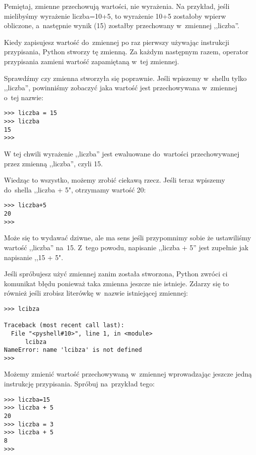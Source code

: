 \documentclass{book}
\begin{document}
Pemiętaj, zmienne przechowują wartości, nie wyrażenia. Na przykład, jeśli mielibyśmy wyrażenie liczba=10+5, to wyrażenie 10+5 zostałoby wpierw obliczone, a~następnie wynik (15) zostałby przechowany w~zmiennej ,,liczba''.

Kiedy zapisujesz wartość do~zmiennej po raz pierwszy używając instrukcji przypisania, Python stworzy tę zmienną. Za każdym następnym razem, operator przypisania zamieni wartość zapamiętaną w~tej zmiennej.

Sprawdźmy czy zmienna stworzyła się poprawnie. Jeśli wpiszemy w~shellu tylko ,,liczba'', powinniśmy zobaczyć jaka wartość jest przechowywana w~zmiennej o~tej nazwie:

\begin{lstlisting}
>>> liczba = 15
>>> liczba
15
>>> 
\end{lstlisting}

W tej chwili wyrażenie ,,liczba'' jest ewaluowane do~wartości przechowywanej przez zmienną ,,liczba'', czyli 15.

Wiedząc to wszystko, możemy zrobić ciekawą rzecz. Jeśli teraz wpiszemy do~shella ,,liczba + 5", otrzymamy wartość 20:

\begin{lstlisting}
>>> liczba+5
20
>>> 
\end{lstlisting}

Może się to wydawać dziwne, ale ma sens jeśli przypomnimy sobie że ustawiliśmy wartość ,,liczba'' na~15. Z~tego powodu, napisanie ,,liczba + 5'' jest zupełnie jak napisanie ,,15 + 5".

Jeśli spróbujesz użyć zmiennej zanim została stworzona, Python zwróci ci komunikat błędu ponieważ taka zmienna jeszcze nie istnieje. Zdarzy się to również jeśli zrobisz literówkę w~nazwie istniejącej zmiennej:


\begin{lstlisting}
>>> lcibza

Traceback (most recent call last):
  File "<pyshell#10>", line 1, in <module>
      lcibza
NameError: name 'lcibza' is not defined
>>> 
\end{lstlisting}

Możemy zmienić wartość przechowywaną w~zmiennej wprowadzając jeszcze jedną instrukcję przypisania. Spróbuj na~przykład tego:

\begin{lstlisting}
>>> liczba=15
>>> liczba + 5
20
>>> liczba = 3
>>> liczba + 5
8
>>> 
\end{lstlisting}
\end{document}
